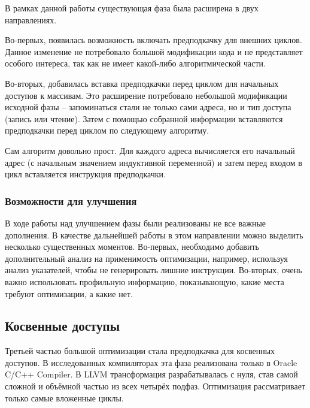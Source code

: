\documentclass[12pt,a4paper,oneside]{article}
\begin{document}
\indent

В рамках данной работы существующая фаза была расширена в двух направлениях.

Во-первых, появилась возможность включать предподкачку для внешних циклов. Данное изменение не потребовало большой модификации кода и не представляет особого интереса, так как не имеет какой-либо алгоритмической части.

Во-вторых, добавилась вставка предподкачки перед циклом для начальных доступов к массивам. Это расширение потребовало небольшой модификации исходной фазы -- запоминаться стали не только сами адреса, но и тип доступа (запись или чтение). Затем с помощью собранной информации вставляются предподкачки перед циклом по следующему алгоритму.



Сам алгоритм довольно прост. Для каждого адреса вычисляется его начальный адрес (с начальным значением индуктивной переменной) и затем перед входом в цикл вставляется инструкция предподкачки.

\subsubsection{Возможности для улучшения}

\indent

В ходе работы над улучшением фазы были реализованы не все важные дополнения. В качестве дальнейшей работы в этом направлении можно выделить несколько существенных моментов. Во-первых, необходимо добавить дополнительный анализ на применимость оптимизации, например, используя анализ указателей, чтобы не генерировать лишние инструкции. Во-вторых, очень важно использовать профильную информацию, показывающую, какие места требуют оптимизации, а какие нет.

\subsection{Косвенные доступы}

\indent

Третьей частью большой оптимизации стала предподкачка для косвенных доступов. В исследованных компиляторах эта фаза реализована только в Oracle C/C++ Compiler. В LLVM трансформация разрабатывалась с нуля, став самой сложной и объёмной частью из всех четырёх подфаз. Оптимизация рассматривает только самые вложенные циклы.
\end{document}
